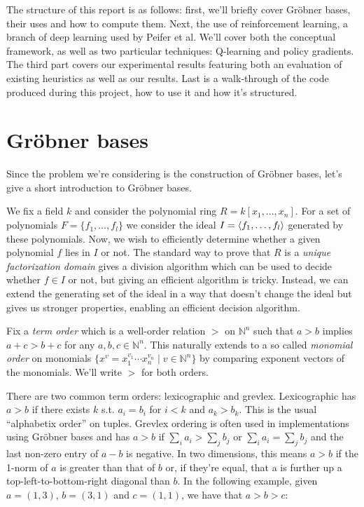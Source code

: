 \documentclass{article}
\theoremstyle{changedot}
\theoremstyle{changedotbreak}
\theoremstyle{nonumberplain}
\DeclarePairedDelimiter{\tuple}{\langle}{\rangle}
\begin{document}
The structure of this report is as follows: first, we'll briefly cover Gröbner bases, their uses and how to compute them. Next, the use of reinforcement learning, a branch of deep learning used by Peifer et al. We'll cover both the conceptual framework, as well as two particular techniques: Q-learning and policy gradients. The third part covers our experimental results featuring both an evaluation of existing heuristics as well as our results. Last is a walk-through of the code produced during this project, how to use it and how it's structured.

\section{Gröbner bases}

Since the problem we're considering is the construction of Gröbner bases, let's give a short introduction to Gröbner bases.

We fix a field $k$ and consider the polynomial ring $R = k[x_{1}, \dots, x_{n}]$. For a set of polynomials $F = \{f_{1}, \dots, f_{l}\}$ we consider the ideal $I = \tuple{f_{1}, \dots, f_{l}}$ generated by these polynomials. Now, we wish to efficiently determine whether a given polynomial $f$ lies in $I$ or not. The standard way to prove that $R$ is a \emph{unique factorization domain} gives a division algorithm which can be used to decide whether $f \in I$ or not, but giving an efficient algorithm is tricky. Instead, we can extend the generating set of the ideal in a way that doesn't change the ideal but gives us stronger properties, enabling an efficient decision algorithm.

Fix a \emph{term order} which is a well-order relation $>$ on $\mathbb N^{n}$ such that $a > b$ implies $a + c > b + c$ for any $a, b, c \in \mathbb N^{n}$. This naturally extends to a so called \emph{monomial order} on monomials $\{x^{v} = x_{1}^{v_{1}} \cdots x_{n}^{v_{n}} \mid v \in \mathbb N^{n}\}$ by comparing exponent vectors of the monomials. We'll write $>$ for both orders.

There are two common term orders: lexicographic and grevlex. Lexicographic has $a > b$ if there exists $k$ s.t. $a_{i} = b_{i}$ for $i < k$ and $a_{k} > b_{k}$. This is the usual ``alphabetix order'' on tuples. Grevlex ordering is often used in implementations using Gröbner bases and has $a > b$ if $\sum_{i} a_{i} > \sum_{j} b_{j}$ or   $\sum_{i} a_{i} = \sum_{j} b_{j}$ and the last non-zero entry of $a - b$ is negative. In two dimensions, this means $a > b$ if the 1-norm of $a$ is greater than that of $b$ or, if they're equal, that a is further up a top-left-to-bottom-right diagonal than $b$. In the following example, given $a=(1, 3)$, $b=(3, 1)$ and $c=(1, 1)$, we have that $a > b > c$:
\end{document}
